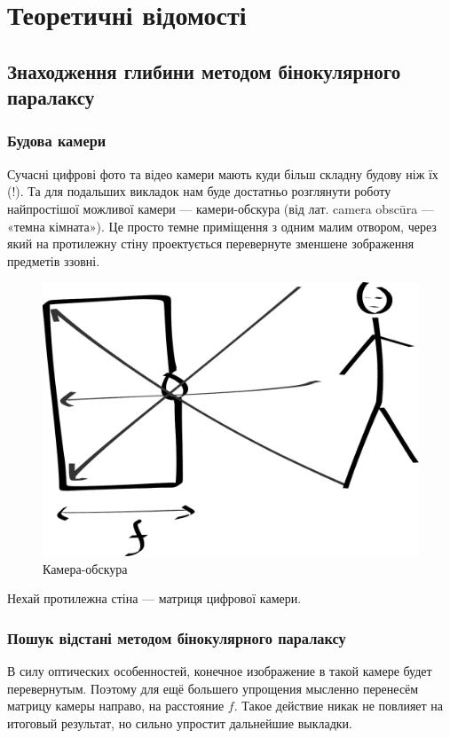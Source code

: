 \chapter{Теоретичні відомості}

\section{Знаходження глибини методом бінокулярного паралаксу}
\subsection{Будова камери}
Сучасні цифрові фото та відео камери мають куди більш складну будову ніж їх (!). Та для подальших викладок нам буде достатньо розглянути роботу найпростішої можливої камери --- камери-обскура (від лат. camera obscūra — «темна кімната»). Це просто темне приміщення з одним малим отвором, через який на протилежну стіну проектується перевернуте зменшене зображення предметів ззовні. 
\begin{figure}[h!]
	\centering
	\includegraphics[scale = 0.5]{CameraObscura.pdf}
	\caption{Камера-обскура}
	\label{1.1.1 - Camera-obscura}
\end{figure}

Нехай протилежна стіна --- матриця цифрової камери. 


\subsection{Пошук відстані методом бінокулярного паралаксу}
В силу оптических особенностей, конечное изображение в такой камере будет перевернутым. Поэтому для ещё большего упрощения мысленно перенесём матрицу камеры направо, на расстояние $f$. Такое действие никак не повлияет на итоговый результат, но сильно упростит дальнейшие выкладки.

